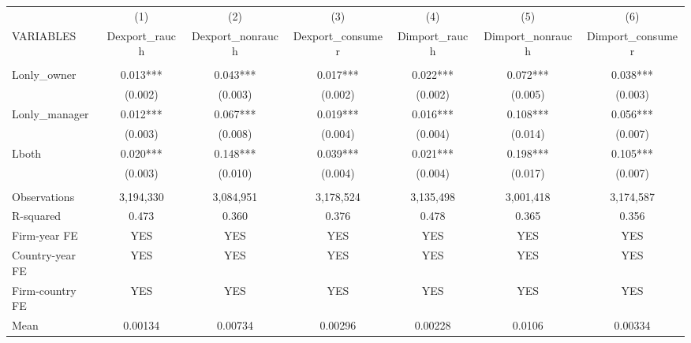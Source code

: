 \begin{tabular}{lcccccc} \hline
 & (1) & (2) & (3) & (4) & (5) & (6) \\
VARIABLES & Dexport\_rauch & Dexport\_nonrauch & Dexport\_consumer & Dimport\_rauch & Dimport\_nonrauch & Dimport\_consumer \\ \hline
 &  &  &  &  &  &  \\
Lonly\_owner & 0.013*** & 0.043*** & 0.017*** & 0.022*** & 0.072*** & 0.038*** \\
 & (0.002) & (0.003) & (0.002) & (0.002) & (0.005) & (0.003) \\
Lonly\_manager & 0.012*** & 0.067*** & 0.019*** & 0.016*** & 0.108*** & 0.056*** \\
 & (0.003) & (0.008) & (0.004) & (0.004) & (0.014) & (0.007) \\
Lboth & 0.020*** & 0.148*** & 0.039*** & 0.021*** & 0.198*** & 0.105*** \\
 & (0.003) & (0.010) & (0.004) & (0.004) & (0.017) & (0.007) \\
 &  &  &  &  &  &  \\
Observations & 3,194,330 & 3,084,951 & 3,178,524 & 3,135,498 & 3,001,418 & 3,174,587 \\
R-squared & 0.473 & 0.360 & 0.376 & 0.478 & 0.365 & 0.356 \\
Firm-year FE & YES & YES & YES & YES & YES & YES \\
Country-year FE & YES & YES & YES & YES & YES & YES \\
Firm-country FE & YES & YES & YES & YES & YES & YES \\
 Mean & 0.00134 & 0.00734 & 0.00296 & 0.00228 & 0.0106 & 0.00334 \\ \hline
\end{tabular}
